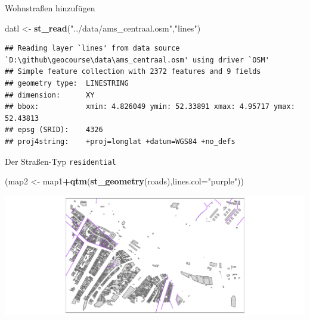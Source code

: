 \documentclass[ignorenonframetext,]{beamer}
\newenvironment{Shaded}{\begin{snugshade}}{\end{snugshade}}
\newcommand{\DataTypeTok}[1]{\textcolor[rgb]{0.13,0.29,0.53}{#1}}
\newcommand{\KeywordTok}[1]{\textcolor[rgb]{0.13,0.29,0.53}{\textbf{#1}}}
\newcommand{\NormalTok}[1]{#1}
\newcommand{\OperatorTok}[1]{\textcolor[rgb]{0.81,0.36,0.00}{\textbf{#1}}}
\newcommand{\StringTok}[1]{\textcolor[rgb]{0.31,0.60,0.02}{#1}}
\begin{document}
\begin{frame}[fragile]{Wohnstraßen hinzufügen}
\protect\hypertarget{wohnstraen-hinzufugen}{}

\begin{Shaded}
\begin{Highlighting}[]
\NormalTok{datl <-}\StringTok{ }\KeywordTok{st_read}\NormalTok{(}\StringTok{"../data/ams_centraal.osm"}\NormalTok{,}\StringTok{"lines"}\NormalTok{)}
\end{Highlighting}
\end{Shaded}

\begin{verbatim}
## Reading layer `lines' from data source `D:\github\geocourse\data\ams_centraal.osm' using driver `OSM'
## Simple feature collection with 2372 features and 9 fields
## geometry type:  LINESTRING
## dimension:      XY
## bbox:           xmin: 4.826049 ymin: 52.33891 xmax: 4.95717 ymax: 52.43813
## epsg (SRID):    4326
## proj4string:    +proj=longlat +datum=WGS84 +no_defs
\end{verbatim}

\begin{Shaded}
\end{Shaded}

\end{frame}

\begin{frame}[fragile]{Der Straßen-Typ \texttt{residential}}
\protect\hypertarget{der-straen-typ-residential}{}

\begin{Shaded}
\begin{Highlighting}[]
\NormalTok{(map2 <-}\StringTok{ }\NormalTok{map1}\OperatorTok{+}\KeywordTok{qtm}\NormalTok{(}\KeywordTok{st_geometry}\NormalTok{(roads),}\DataTypeTok{lines.col=}\StringTok{"purple"}\NormalTok{))}
\end{Highlighting}
\end{Shaded}

\includegraphics{B7_simplefeatures_files/figure-beamer/unnamed-chunk-35-1.pdf}

\end{frame}
\end{document}
